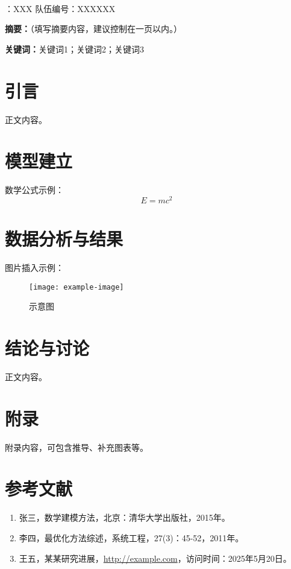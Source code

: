 \documentclass[12pt,a4paper]{article}
\begin{document}
\thispagestyle{empty}
\begin{center}
     \\
    \vspace{1em}
    ：XXX \quad 队伍编号：XXXXXX \\
\end{center}

\vspace{2em}

\noindent\textbf{摘要：}（填写摘要内容，建议控制在一页以内。）

\vspace{1em}

\noindent\textbf{关键词：}关键词1；关键词2；关键词3

\newpage

\section{引言}
正文内容。

\section{模型建立}
数学公式示例：
\[
E = mc^2
\]

\section{数据分析与结果}
图片插入示例：
\begin{figure}[h]
    \centering
    \texttt{[image: example-image]} %
    \caption{示意图}
\end{figure}

\section{结论与讨论}
正文内容。

\newpage
\section*{附录}
附录内容，可包含推导、补充图表等。

\newpage
\section*{参考文献}
\begin{enumerate}
    \item 张三，数学建模方法，北京：清华大学出版社，2015年。
    \item 李四，最优化方法综述，系统工程，27(3)：45-52，2011年。%
    \item 王五，某某研究进展，\url{http://example.com}，访问时间：2025年5月20日。
\end{enumerate}
\end{document}
